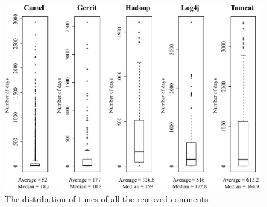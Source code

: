 \begin{figure}[t]
	\centering
	\includegraphics[width=\columnwidth]{box_distribution.pdf}
	\caption{The distribution of times of all the removed \SATD comments.}
	\label{fig:removed_all_std_comments}
\end{figure}




